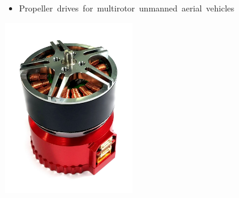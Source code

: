 \documentclass{document_templates/documentation_template_latex/zubaxdoc}
\begin{document}
\begin{titlepage}
\begin{itemize}
    \item \mbox{Propeller drives for multirotor unmanned aerial vehicles}
\end{itemize}

\centering
\includegraphics[width=0.42\textwidth]{figures/sadulli_grosso_pic}
\end{titlepage}

\tableofcontents
\BeginRightColumn
\listoffigures
\listoftables

\mainmatter




\end{document}
